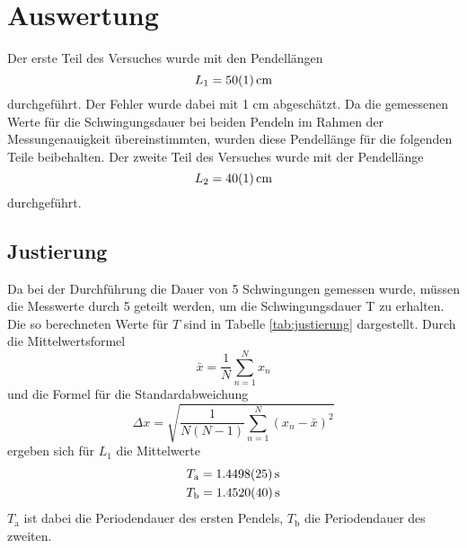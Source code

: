 \section{Auswertung}
\label{sec:Auswertung}

Der erste Teil des Versuches wurde mit den Pendellängen
\begin{equation*}
    L_1 = \SI{50 +- 1}{cm} 
\end{equation*}
durchgeführt. Der Fehler wurde dabei mit 1 cm abgeschätzt. Da die gemessenen Werte für die Schwingungsdauer bei beiden Pendeln im Rahmen der Messungenauigkeit übereinstimmten,
wurden diese Pendellänge für die folgenden Teile beibehalten.
Der zweite Teil des Versuches wurde mit der Pendellänge
\begin{equation*}
    L_2 = \SI{40 +- 1}{cm}
\end{equation*}
durchgeführt.

\subsection{Justierung}



Da bei der Durchführung die Dauer von 5 Schwingungen gemessen wurde, müssen die Messwerte durch 5 geteilt werden, um die Schwingungsdauer T zu erhalten.
Die so berechneten Werte für $T$ sind in Tabelle \ref{tab:justierung} dargestellt.
Durch die Mittelwertsformel 
\begin{equation}
    \label{eq:mittelwert}
    \bar{x} = \frac{1}{N} \sum_{n=1}^N x_n
\end{equation}
und die Formel für die Standardabweichung
\begin{equation}
    \label{eq:abweichung}
    \Delta x = \sqrt{\frac{1}{N(N-1)} \sum_{n=1}^N (x_n-\bar{x})^2 }
\end{equation}
ergeben sich für $L_1$ die Mittelwerte
\begin{gather*}
    T_\text{a} = \SI{1.4498 +- 0.0025}{s} \\
    T_\text{b} = \SI{1.4520 +- 0.0040}{s}
\end{gather*}
$T_\text{a}$ ist dabei die Periodendauer des ersten Pendels, $T_\text{b}$ die Periodendauer des zweiten.

